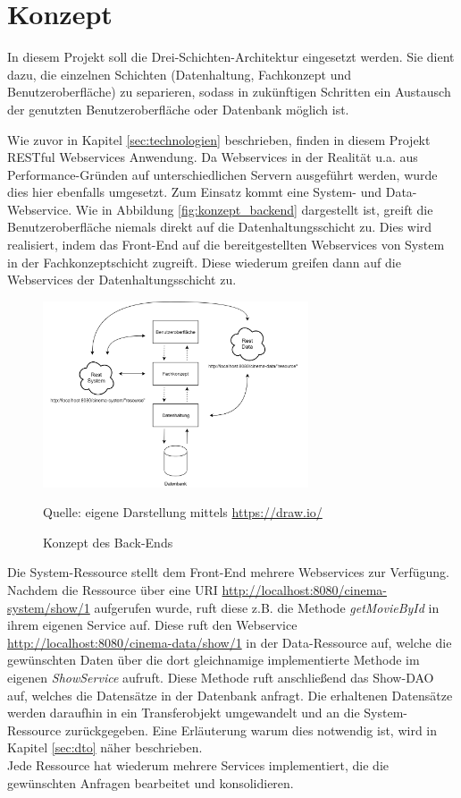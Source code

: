 \section{Konzept}
\label{sec:konzept}
In diesem Projekt soll die Drei-Schichten-Architektur eingesetzt werden.
Sie dient dazu, die einzelnen Schichten (Datenhaltung, Fachkonzept und Benutzeroberfläche) zu separieren, sodass in zukünftigen Schritten ein Austausch der genutzten Benutzeroberfläche oder Datenbank möglich ist. 

Wie zuvor in Kapitel \vref{sec:technologien} beschrieben, finden in diesem Projekt \acs{REST}ful Webservices Anwendung.
Da Webservices in der Realität u.a. aus Performance-Gründen auf unterschiedlichen Servern ausgeführt werden, wurde dies hier ebenfalls umgesetzt.
Zum Einsatz kommt eine System- und Data-Webservice.
Wie in Abbildung \vref{fig:konzept_backend} dargestellt ist, greift die Benutzeroberfläche niemals direkt auf die Datenhaltungsschicht zu.
Dies wird realisiert, indem das Front-End auf die bereitgestellten Webservices von System in der Fachkonzeptschicht zugreift. 
Diese wiederum greifen dann auf die Webservices der Datenhaltungsschicht zu.

\begin{figure}[ht]
	\centering
	\includegraphics[width=0.7\textwidth]{img/backend/rest}
	\captionsetup{format=hang}
	\caption{Konzept des Back-Ends}
	\small Quelle: eigene Darstellung mittels \url{https://draw.io/}
	\label{fig:konzept_backend}
	\end{figure}

Die System-Ressource stellt dem Front-End mehrere Webservices zur Verfügung.
Nachdem die Ressource über eine \acs{URI} \url{http://localhost:8080/cinema-system/show/1} aufgerufen wurde, ruft diese z.B. die Methode \textit{getMovieById} in ihrem eigenen Service auf.
Diese ruft den Webservice \url{http://localhost:8080/cinema-data/show/1} in der Data-Ressource auf, welche die gewünschten Daten über die dort gleichnamige implementierte Methode im eigenen \textit{ShowService} aufruft. Diese Methode ruft anschließend das Show-\acs{DAO} auf, welches die Datensätze in der Datenbank anfragt. 
Die erhaltenen Datensätze werden daraufhin in ein Transferobjekt umgewandelt und an die System-Ressource zurückgegeben.
Eine Erläuterung warum dies notwendig ist, wird in Kapitel \vref{sec:dto} näher beschrieben. \\
Jede Ressource hat wiederum mehrere Services implementiert, die die gewünschten Anfragen bearbeitet und konsolidieren.

